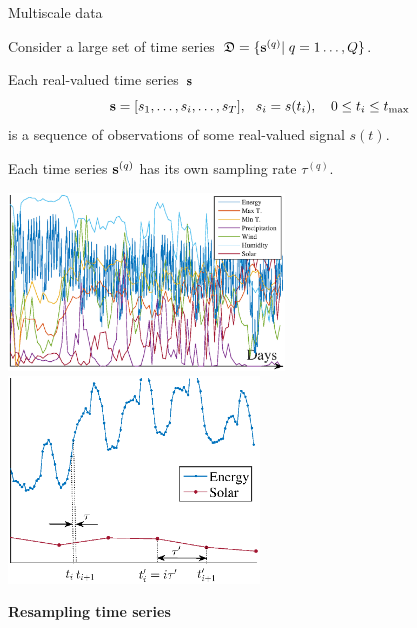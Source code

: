 \documentclass{beamer}
\begin{document}
\begin{frame}{Multiscale data}

Consider a large set of time series~${\mathfrak{D}}=\{{\mathbf{s}}^{(q)}| \; q = 1\dots, {Q}\}$.

\smallskip
Each real-valued time series~${\mathbf{s}}$ \[ {\mathbf{s}} = [s_1, \dots, s_i, \dots, s_{T}], ~~ s_i = s(t_i),\quad 0 \leq t_i \leq t_{\max}\]
is a sequence of observations  of some real-valued signal $s(t)$.


\smallskip
Each time series ${\mathbf{s}}^{(q)}$ has its own sampling rate $\tau^{(q)}$.

\includegraphics[width=0.55\textwidth]{data_example_100days.eps}
\includegraphics[width=0.5\textwidth]{data_sampling_100days.eps}

\end{frame}
\begin{frame}
\vfill
\begin{center}
{\Large \bf Resampling time series}
\end{center}
\vfill
\end{frame}
\end{document}
